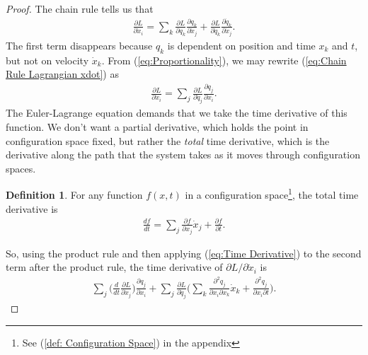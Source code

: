 \documentclass[10pt, psamsfonts]{amsart}
\theoremstyle{definition}
\newtheorem{defn}[thm]{Definition}
\theoremstyle{remark}
\numberwithin{equation}{section}
\begin{document}
\begin{proof}
The chain rule tells us that
\begin{align}
  \label{eq:Chain Rule Lagrangian xdot} 
  \frac{\partial L}{\partial \dot{x}_i}  = \sum_k \frac{\partial L}{\partial q_k} \frac{\partial q_k}{\partial \dot{x}_j} + \frac{\partial L}{\partial \dot{q}_k} \frac{\partial \dot{q}_k}{\partial \dot{x}_j}.
\end{align}
The first term disappears because $q_k$ is dependent on position and time $x_k$ and $t$, but not on velocity $\dot{x}_k$. From (\ref{eq:Proportionality}), we may rewrite (\ref{eq:Chain Rule Lagrangian xdot}) as
\begin{align*}
  \frac{\partial L}{\partial \dot{x}_i} = \sum_j \frac{\partial L}{\partial \dot{q}_j} \frac{\partial q_j}{\partial x_i}. 
\end{align*}
The Euler-Lagrange equation demands that we take the time derivative of this function. We don't want a partial derivative, which holds the point in configuration space fixed, but rather the \textit{total} time derivative, which is the derivative along the path that the system takes as it moves through configuration spaces.

\begin{defn}
For any function $f(x,t)$ in a configuration space\footnote{See (\ref{def: Configuration Space}) in the appendix}, the total time derivative is
\begin{align}
  \label{eq:Time Derivative}
  \frac{df}{dt} = \sum_j \frac{\partial f}{\partial x_j} \dot{x}_j + \frac{\partial f}{\partial t}. 
\end{align}
\end{defn}
\noindent So, using the product rule and then applying (\ref{eq:Time Derivative}) to the second term after the product rule, the time derivative of $\partial L/\partial \dot{x}_i$ is
\begin{align}
  \label{eq:Time Derivative Lagrangian}
  \sum_j \bigg(\frac{d}{dt} \frac{\partial L}{\partial \dot{x}_j}  \bigg) \frac{\partial q_j}{\partial x_i} + \sum_j \frac{\partial L}{\partial \dot{q}_j} \bigg(\sum_{k} \frac{\partial^2 q_j}{\partial x_i \partial x_k} \dot{x}_k + \frac{\partial^2 q_j}{\partial x_i \partial t}  \bigg).
\end{align}


\end{proof}
\end{document}
